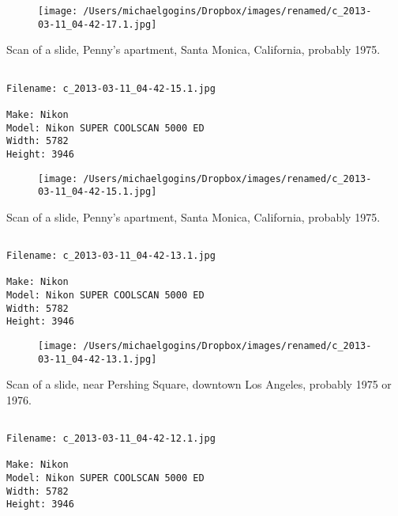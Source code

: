 \documentclass[11pt,letter,DIV=14,paper=landscape]{scrbook}
\begin{document}
\begin{figure}
\texttt{[image: /Users/michaelgogins/Dropbox/images/renamed/c\_2013-03-11\_04-42-17.1.jpg]}
\end{figure}
    
\clearpage
\noindent Scan of a slide, Penny's apartment, Santa Monica, California, probably 1975.
\noindent
\begin{lstlisting}

Filename: c_2013-03-11_04-42-15.1.jpg

Make: Nikon
Model: Nikon SUPER COOLSCAN 5000 ED
Width: 5782
Height: 3946
\end{lstlisting}
\clearpage

\begin{figure}
\texttt{[image: /Users/michaelgogins/Dropbox/images/renamed/c\_2013-03-11\_04-42-15.1.jpg]}
\end{figure}
    
\clearpage
\noindent Scan of a slide, Penny's apartment, Santa Monica, California, probably 1975.
\noindent
\begin{lstlisting}

Filename: c_2013-03-11_04-42-13.1.jpg

Make: Nikon
Model: Nikon SUPER COOLSCAN 5000 ED
Width: 5782
Height: 3946
\end{lstlisting}
\clearpage

\begin{figure}
\texttt{[image: /Users/michaelgogins/Dropbox/images/renamed/c\_2013-03-11\_04-42-13.1.jpg]}
\end{figure}
    
\clearpage
\noindent Scan of a slide, near Pershing Square, downtown Los Angeles, probably 1975 or 1976.
\noindent
\begin{lstlisting}

Filename: c_2013-03-11_04-42-12.1.jpg

Make: Nikon
Model: Nikon SUPER COOLSCAN 5000 ED
Width: 5782
Height: 3946
\end{lstlisting}
\clearpage
\end{document}
